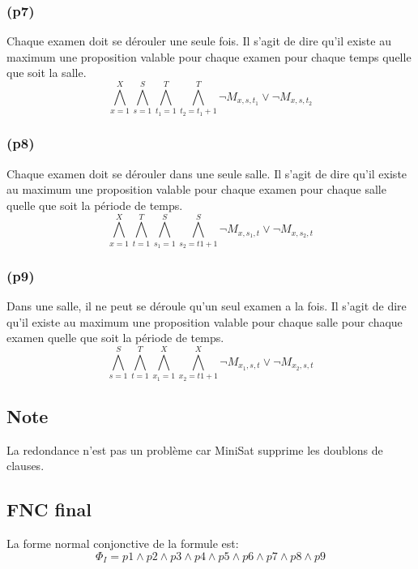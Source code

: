 \documentclass[a4paper,11pt]{article}
\begin{document}
\subsubsection{(p7)}
Chaque examen doit se dérouler une seule fois.
Il s'agit de dire qu'il existe au maximum une proposition valable pour chaque examen pour chaque temps quelle que soit la salle.
\begin{displaymath}
\bigwedge\limits_{x=1}^{X}\bigwedge\limits_{s=1}^{S}\bigwedge\limits_{t_{1}=1}^{T}\bigwedge\limits_{t_{2}=t_{1}+1}^{T} \neg M_{x, s, t_{1}} \vee \neg M_{x, s, t_{2}}
\end{displaymath}

\subsubsection{(p8)}
Chaque examen doit se dérouler dans une seule salle.
Il s'agit de dire qu'il existe au maximum une proposition valable pour chaque examen pour chaque salle quelle que soit la période de temps.
\begin{displaymath}
\bigwedge\limits_{x=1}^{X}\bigwedge\limits_{t=1}^{T}\bigwedge\limits_{s_{1}=1}^{S}\bigwedge\limits_{s_{2}=t1+1}^{S} \neg M_{x, s_{1}, t} \vee \neg M_{x, s_{2}, t}
\end{displaymath}

\subsubsection{(p9)}
Dans une salle, il ne peut se déroule qu'un seul examen a la fois.
Il s'agit de dire qu'il existe au maximum une proposition valable pour chaque salle pour chaque examen quelle que soit la période de temps.
\begin{displaymath}
\bigwedge\limits_{s=1}^{S}\bigwedge\limits_{t=1}^{T}\bigwedge\limits_{x_{1}=1}^{X}\bigwedge\limits_{x_{2}=t1+1}^{X} \neg M_{x_{1}, s, t} \vee \neg M_{x_{2}, s, t}
\end{displaymath}

\subsection{Note}
La redondance n'est pas un problème car MiniSat supprime les doublons de clauses.

\subsection{FNC final}
La forme normal conjonctive de la formule est:
\begin{displaymath}
\Phi_{I} = p1 \wedge p2 \wedge p3 \wedge p4 \wedge p5 \wedge p6 \wedge p7 \wedge p8 \wedge p9
\end{displaymath}
\end{document}

